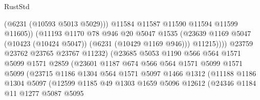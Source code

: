 \begin{lexlean}{RustStd}
\begin{coremodule}
{{                                      (@6231 (@10593 @5013 @5029)))
                                    @11584
                                    @11587
                                    @11590
                                    @11594
                                    @11599
                                    @11605))
                                (@11193
                                  @1170
                                  @78
                                  @946
                                  @20
                                  @5047
                                  @1535
                                  (@23639
                                    @1169
                                    @5047
                                    (@10423 (@10424 @5047))
                                    (@6231 (@10429 @1169 @946)))
                                  @11215))))
                          @23759
                          @23762
                          @23765
                          @23767
                          @11232)
                        (@23685
                          @5053
                          @1190
                          @566
                          @564
                          @1571
                          @5099
                          @1571
                          @2859
                          (@23601
                            @1187
                            @674
                            @566
                            @564
                            @1571
                            @5099
                            @1571
                            @5099
                            (@23715
                              @1186
                              @1304
                              @564
                              @1571
                              @5097
                              @1466
                              @1312
                              (@11188
                                @1186
                                @1304
                                @5097
                                (@12599
                                  @1185
                                  @49
                                  @1303
                                  @1659
                                  @5096
                                  @12612
                                  (@24346
                                    @1184
                                    @11
                                    @1277
                                    @5087
                                    @5095
}}
\end{coremodule}
\end{lexlean}
